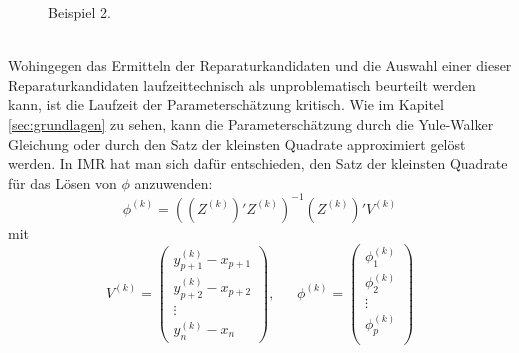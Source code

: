 \begin{figure}
    \caption{Beispiel 2.}\label{fig:2}
\end{figure}
~\\
Wohingegen das Ermitteln der Reparaturkandidaten und die Auswahl einer dieser Reparaturkandidaten laufzeittechnisch als unproblematisch beurteilt werden kann,
ist die Laufzeit der Parameterschätzung kritisch. Wie im Kapitel \ref{sec:grundlagen} zu sehen, kann die Parameterschätzung durch die Yule-Walker Gleichung oder durch den Satz der kleinsten Quadrate approximiert gelöst werden. In IMR hat man sich dafür entschieden, den Satz der kleinsten Quadrate für das Lösen von $\phi$ anzuwenden:
\[
    \phi^{(k)} = \left(\left(Z^{(k)}\right)' Z^{(k)} \right)^{-1} \left(Z^{(k)}\right)'V^{(k)}
\]
mit
\[
    V^{(k)} = \left(\begin{matrix}
        y^{(k)}_{p+1} - x_{p+1}\\
        y^{(k)}_{p+2} - x_{p+2}\\
        \vdots\\
        y^{(k)}_{n} - x_{n}
    \end{matrix}\right),~~~~~~~
    \phi^{(k)} = \left(\begin{matrix}
        \phi_1^{(k)}\\
        \phi_2^{(k)}\\
        \vdots\\
        \phi_p^{(k)}\\
    \end{matrix}\right)
\]
